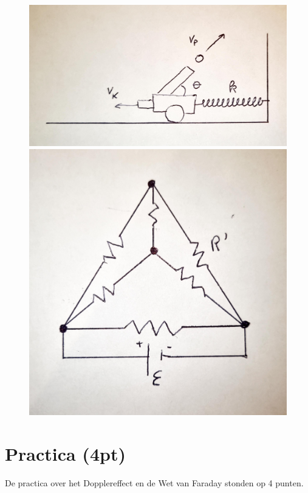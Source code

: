 \documentclass[kulak]{kulakarticle} %
\begin{document}
\begin{figure}[h!]
	\centering
	\includegraphics[height=.3\textwidth]{oef1}\hspace{1cm}
	\includegraphics[height=.3\textwidth]{oef2}
\end{figure}

\section{Practica (4pt)}

De practica over het Dopplereffect en de Wet van Faraday stonden op 4 punten.
\end{document}

